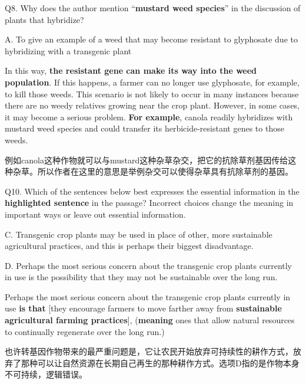 \begin{blk}
    \begin{qst}
        Q8. Why does the author mention “\textbf{mustard weed species}” in the discussion of plants that hybridize?
    \end{qst}

    \begin{chc}
        A. To give an example of a weed that may become resistant to glyphosate due to hybridizing with a transgenic plant
    \end{chc}

    \begin{psgq}
        In this way, \textbf{the resistant gene can make its way into the weed population}. If this happens, a farmer can no longer use glyphosate, for example, to kill those weeds. This scenario is not likely to occur in many instances because there are no weedy relatives growing near the crop plant. However, in some cases, it may become a serious problem. \textbf{For example}, canola readily hybridizes with mustard weed species and could transfer its herbicide-resistant genes to those weeds.
    \end{psgq}

    \begin{nlz}
        例如canola这种作物就可以与mustard这种杂草杂交，把它的抗除草剂基因传给这种杂草。所以作者在这里的意思是举例杂交可以使得杂草具有抗除草剂的基因。
    \end{nlz}
\end{blk}

\begin{blk}
    \begin{qst}
        Q10. Which of the sentences below best expresses the essential information in the \textbf{highlighted sentence} in the passage? Incorrect choices change the meaning in important ways or leave out essential information.
    \end{qst}

    \begin{chc}
        C. Transgenic crop plants may be used in place of other, more sustainable agricultural practices, and this is perhaps their biggest disadvantage.

        D. Perhaps the most serious concern about the transgenic crop plants currently in use is the possibility that they may not be sustainable over the long run.
    \end{chc}

    \begin{psgq}
        Perhaps the most serious concern about the transgenic crop plants currently in use \textbf{is that} [they encourage farmers to move farther away from \textbf{sustainable agricultural farming practices}], (\textbf{meaning} ones that allow natural resources to continually regenerate over the long run.)
    \end{psgq}

    \begin{nlz}
        也许转基因作物带来的最严重问题是，它让农民开始放弃可持续性的耕作方式，放弃了那种可以让自然资源在长期自己再生的那种耕作方式。选项D指的是作物本身不可持续，逻辑错误。
    \end{nlz}
\end{blk}

\newpage